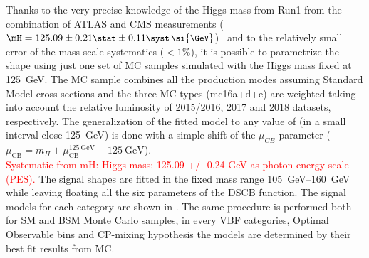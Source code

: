 Thanks to the very precise knowledge of the Higgs mass from Run1 from the combination of ATLAS and CMS measurements ($\mH=125.09\err{0.21}\stat\err{0.11}\syst \, \si{\GeV}$)~\cite{HIGG-2014-14} and to the relatively small error of the mass scale systematics ($<1\%$), it is possible to parametrize the shape using just one set of MC samples simulated with the Higgs mass \mH fixed at \SI{125}{\GeV}. The MC sample combines all the production modes assuming Standard Model cross sections and the three MC types (mc16a+d+e) are weighted taking into account the relative luminosity of 2015/2016, 2017 and 2018 datasets, respectively. The generalization of the fitted model to any value of \mH (in a small interval close \SI{125}{\GeV}) is done with a simple shift of the $\mu_{CB}$ parameter ($\mu_\text{CB}= m_H + \mu_\text{CB}^{\SI{125}{\GeV}} - \SI{125}{\GeV}$).\\

\textcolor{red}{Systematic from mH:  Higgs mass: 125.09 +/- 0.24 GeV as photon energy scale (PES).}
The signal shapes are fitted in the fixed mass range \SIrange{105}{160}{\GeV} while leaving floating all the six parameters of the DSCB function. The signal models for each category are shown in \Fig{\ref{fig:signal_shapes}}. The same procedure is performed both for SM and BSM Monte Carlo samples, in every VBF categories, Optimal Observable bins  and CP-mixing hypothesis the \myy models are determined by their best fit results from MC.


